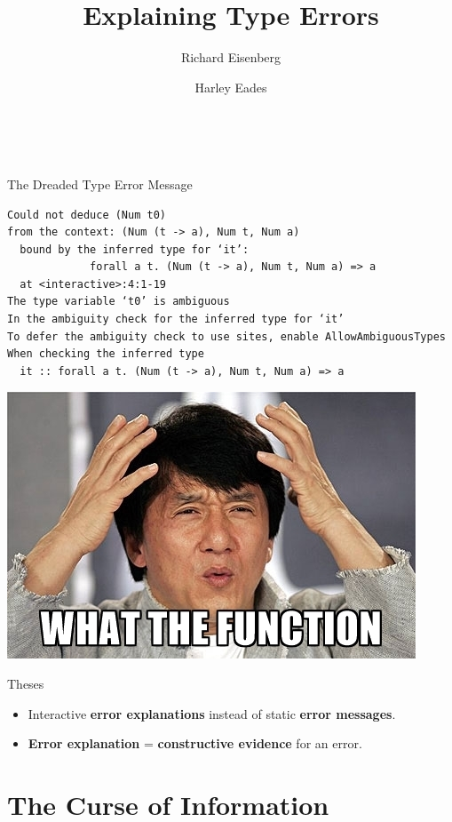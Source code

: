 \documentclass[xcolor=svgnames,12pt,aspectratio=169]{beamer}
\title{Explaining Type Errors}
\date{\theschool \\ \thedate}
\author{\usebeamercolor[fg]{title}{Brent Yorgey} \and Richard
  Eisenberg \and Harley Eades}
\newenvironment{xframe}[1][]
  {\begin{frame}[fragile,environment=xframe,#1]}
  {\end{frame}}
\renewcommand{\emph}{\textbf}
\begin{document}
\begin{xframe}{}
   \titlepage
\end{xframe}

\begin{xframe}{The Dreaded Type Error Message}
\footnotesize
\begin{verbatim}
Could not deduce (Num t0)
from the context: (Num (t -> a), Num t, Num a)
  bound by the inferred type for ‘it’:
             forall a t. (Num (t -> a), Num t, Num a) => a
  at <interactive>:4:1-19
The type variable ‘t0’ is ambiguous
In the ambiguity check for the inferred type for ‘it’
To defer the ambiguity check to use sites, enable AllowAmbiguousTypes
When checking the inferred type
  it :: forall a t. (Num (t -> a), Num t, Num a) => a
\end{verbatim}
\end{xframe}

\begin{xframe}{}
  \begin{center}
    \includegraphics{what-the-function.jpg}
  \end{center}
\end{xframe}

\begin{xframe}{Theses}
  \begin{itemize}
  \item<+-> Interactive \emph{error explanations} instead of static
    \emph{error messages}.
  \item<+-> \emph{Error explanation} = \emph{constructive evidence} for
    an error.
  \end{itemize}
\end{xframe}

\section{The Curse of Information}
\end{document}
